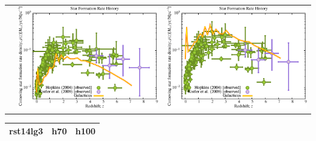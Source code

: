 \documentclass[a4paper,11pt,fleqn,oneside]{book}
\begin{document}
\begin{itemize}
\begin{table}[p]
\begin{tabular}{l|c|c}
 & \includegraphics[scale=0.5]{r256/h70/red_st14_log2/Plot_Star_Formation_History.pdf} & \includegraphics[scale=0.5]{r256/h100/red_st14_log2/Plot_Star_Formation_History.pdf} \\
\end{tabular}
\end{table}
\begin{table}[p]
\centering
\begin{tabular}{l|c|c}
 rst14lg3 & h70 & h100 \\
\hline 

\end{tabular}
\end{table}
\end{itemize}
\end{document}
